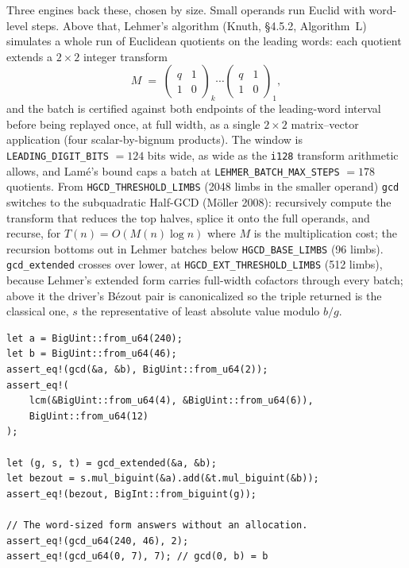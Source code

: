 \documentclass[11pt]{article}
\newcommand{\code}[1]{\texttt{#1}}
\begin{document}
Three engines back these, chosen by size. Small operands run Euclid with
word-level steps. Above that, Lehmer's algorithm (Knuth, \S4.5.2,
Algorithm~L) simulates a whole run of Euclidean quotients on the leading
words: each quotient extends a $2 \times 2$ integer transform
\begin{equation}
M \;=\; \begin{pmatrix} q & 1 \\ 1 & 0 \end{pmatrix}_{\!k}
\cdots
\begin{pmatrix} q & 1 \\ 1 & 0 \end{pmatrix}_{\!1},
\end{equation}
and the batch is certified against both endpoints of the leading-word
interval before being replayed once, at full width, as a single
$2 \times 2$ matrix--vector application (four scalar-by-bignum products).
The window is \code{LEADING\_DIGIT\_BITS} $= 124$ bits wide, as wide as
the \code{i128} transform arithmetic allows, and Lam\'e's bound caps a batch
at \code{LEHMER\_BATCH\_MAX\_STEPS} $= 178$ quotients. From
\code{HGCD\_THRESHOLD\_LIMBS} (2048 limbs in the smaller operand)
\code{gcd} switches to the subquadratic Half-GCD (M\"oller 2008):
recursively compute the transform that reduces the top halves, splice it
onto the full operands, and recurse, for
$T(n) = O\!\left(M(n) \log n\right)$ where $M$ is the multiplication cost;
the recursion bottoms out in Lehmer batches below \code{HGCD\_BASE\_LIMBS}
(96 limbs). \code{gcd\_extended} crosses over lower, at
\code{HGCD\_EXT\_THRESHOLD\_LIMBS} (512 limbs), because Lehmer's extended
form carries full-width cofactors through every batch; above it the driver's
B\'ezout pair is canonicalized so the triple returned is the classical one,
$s$ the representative of least absolute value modulo $b/g$.

\begin{lstlisting}
let a = BigUint::from_u64(240);
let b = BigUint::from_u64(46);
assert_eq!(gcd(&a, &b), BigUint::from_u64(2));
assert_eq!(
    lcm(&BigUint::from_u64(4), &BigUint::from_u64(6)),
    BigUint::from_u64(12)
);

let (g, s, t) = gcd_extended(&a, &b);
let bezout = s.mul_biguint(&a).add(&t.mul_biguint(&b));
assert_eq!(bezout, BigInt::from_biguint(g));

// The word-sized form answers without an allocation.
assert_eq!(gcd_u64(240, 46), 2);
assert_eq!(gcd_u64(0, 7), 7); // gcd(0, b) = b
\end{lstlisting}
\end{document}
